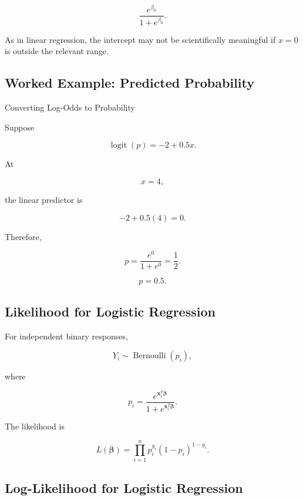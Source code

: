 \[
\boxed{
\frac{
e^{\beta_0}
}{
1+e^{\beta_0}
}.
}
\]

As in linear regression, the intercept may not be scientifically
meaningful if \(x=0\) is outside the relevant range.

\subsection{Worked Example: Predicted Probability}
\label{subsec:worked-logistic-probability}

\begin{workedexamplebox}{Converting Log-Odds to Probability}

Suppose

\[
\operatorname{logit}(p)
=
-2+0.5x.
\]

At

\[
x=4,
\]

the linear predictor is

\[
-2+0.5(4)=0.
\]

Therefore,

\[
p
=
\frac{
e^0
}{
1+e^0
}
=
\frac12.
\]

\begin{answerbox}
\[
\boxed{
p=0.5.
}
\]
\end{answerbox}

\end{workedexamplebox}

\subsection{Likelihood for Logistic Regression}
\label{subsec:logistic-likelihood}

For independent binary responses,

\[
Y_i
\sim
\operatorname{Bernoulli}(p_i),
\]

where

\[
p_i
=
\frac{
e^{\mathbf{x}_i^T\boldsymbol{\beta}}
}{
1+
e^{\mathbf{x}_i^T\boldsymbol{\beta}}
}.
\]

The likelihood is

\[
\boxed{
L(\boldsymbol{\beta})
=
\prod_{i=1}^{n}
p_i^{y_i}
(1-p_i)^{1-y_i}.
}
\]

\subsection{Log-Likelihood for Logistic Regression}
\label{subsec:logistic-log-likelihood}

